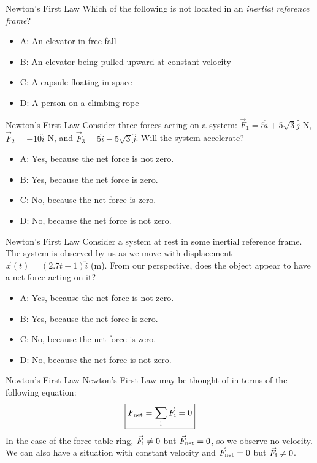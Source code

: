 \documentclass{beamer}
\begin{document}
\begin{frame}{Newton's First Law}
Which of the following is not located in an \textit{inertial reference frame}?
\begin{itemize}
\item A: An elevator in free fall
\item B: An elevator being pulled upward at constant velocity
\item C: A capsule floating in space
\item D: A person on a climbing rope
\end{itemize}
\end{frame}

\begin{frame}{Newton's First Law}
Consider three forces acting on a system: $\vec{F}_1 = 5\hat{i}+5\sqrt{3}\hat{j}$ N, $\vec{F}_2 = -10\hat{i}$ N, and $\vec{F}_3 = 5\hat{i}-5\sqrt{3}\hat{j}$.  Will the system accelerate?
\begin{itemize}
\item A: Yes, because the net force is not zero.
\item B: Yes, because the net force is zero.
\item C: No, because the net force is zero.
\item D: No, because the net force is not zero.
\end{itemize}
\end{frame}

\begin{frame}{Newton's First Law}
Consider a system at rest in some inertial reference frame.  The system is observed by us as we move with displacement $\vec{x}(t) = (2.7t - 1)\hat{i}$ (m).  From our perspective, does the object appear to have a net force acting on it?
\begin{itemize}
\item A: Yes, because the net force is not zero.
\item B: Yes, because the net force is zero.
\item C: No, because the net force is zero.
\item D: No, because the net force is not zero.
\end{itemize}
\end{frame}

\begin{frame}{Newton's First Law}
Newton's First Law may be thought of in terms of the following equation:
\begin{equation}
\boxed{F_{\rm net} = \sum_{\rm i} \vec{F}_{\rm i} = 0}
\label{eq:firstlaw}
\end{equation}
In the case of the force table ring, $\vec{F}_{\rm i} \neq 0$ but $\vec{F}_{\rm net} = 0$, so we observe no velocity.  We can also have a situation with constant velocity and $\vec{F}_{\rm net} = 0$  but $\vec{F}_{\rm i} \neq 0$.
\end{frame}
\end{document}
